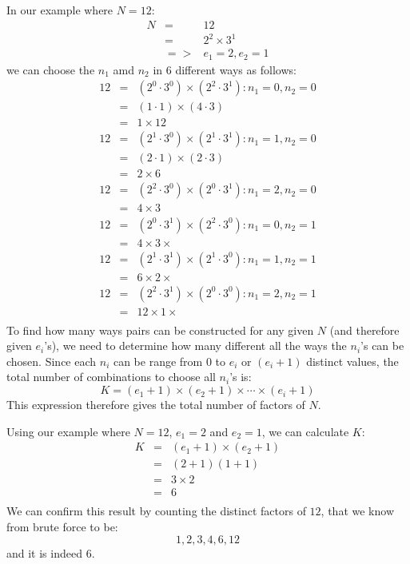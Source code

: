 \documentclass{article}
\begin{document}
In our example where $N =12$:
\begin{eqnarray*}
N & = & 12\\
& = & 2 ^ 2 \times 3 ^ 1 \\
& => & e_1 = 2, e_2 = 1
\end{eqnarray*}
we can choose the $n_1$ amd $n_2$ in 6 different ways as follows:
\begin{eqnarray*}
12 &=& (2^0 \cdot 3^0) \times (2^2 \cdot 3^1) : n_1 = 0, n_2 = 0 \\
   &=& (1 \cdot 1) \times (4 \cdot 3) \\
   &=& 1 \times 12 \\
12 &=& (2^1 \cdot 3^0) \times (2^1 \cdot 3^1) : n_1 = 1, n_2 = 0\\
   &=& (2 \cdot 1) \times (2 \cdot 3) \\
   &=& 2 \times 6 \\
12 &=& (2^2 \cdot 3^0) \times (2^0 \cdot 3^1) : n_1 = 2, n_2 = 0\\
   &=& 4 \times 3 \\
12 &=& (2^0 \cdot 3^1) \times (2^2 \cdot 3^0) : n_1 = 0, n_2 = 1\\
   &=& 4 \times 3 \times  \\
12 &=& (2^1 \cdot 3^1) \times (2^1 \cdot 3^0) : n_1 = 1, n_2 = 1\\
   &=& 6 \times 2 \times  \\
12 &=& (2^2 \cdot 3^1) \times (2^0 \cdot 3^0) : n_1 = 2, n_2 = 1\\
   &=& 12 \times 1 \times  \\
\end{eqnarray*}
To find how many ways pairs can be constructed for any given $N$ (and therefore given $e_i$'s), we need to determine how many different all the ways the $n_i$'s can be chosen. 
Since each $n_i$ can be range from $0$ to $e_i$ or $(e_i + 1)$ distinct values, the total number of combinations to choose all $n_i$'s is:
$$
K = (e_1 +1) \times (e_2 + 1) \times \cdots \times (e_i + 1)
$$
This expression therefore gives the total number of factors of $N$.

Using our example where $N = 12$, $e_1 = 2$ and $e_2 = 1$, we can calculate $K$:
\begin{eqnarray*}
K & = & (e_1 +1) \times (e_2 + 1) \\
  & = & (2 + 1) ( 1 + 1) \\
  & = & 3 \times 2 \\
  & = & 6 \\
\end{eqnarray*}
We can confirm this result by counting the distinct factors of $12$, that we know from brute force to be:
$$
1, 2, 3, 4, 6, 12
$$
and it is indeed 6.
\end{document}

